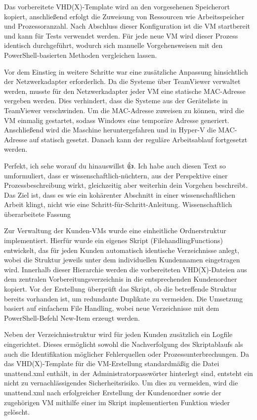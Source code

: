 \documentclass[conference]{IEEEtran}
\begin{document}
Das vorbereitete VHD(X)-Template wird an den vorgesehenen Speicherort kopiert, anschließend erfolgt die Zuweisung von Ressourcen wie Arbeitsspeicher und Prozessoranzahl. Nach Abschluss dieser Konfiguration ist die VM startbereit und kann für Tests verwendet werden. Für jede neue VM wird dieser Prozess identisch durchgeführt, wodurch sich manuelle Vorgehensweisen mit den PowerShell-basierten Methoden vergleichen lassen.

Vor dem Einstieg in weitere Schritte war eine zusätzliche Anpassung hinsichtlich der Netzwerkadapter erforderlich. Da die Systeme über TeamViewer verwaltet werden, musste für den Netzwerkadapter jeder VM eine statische MAC-Adresse vergeben werden. Dies verhindert, dass die Systeme aus der Geräteliste in TeamViewer verschwinden. Um die MAC-Adresse zuweisen zu können, wird die VM einmalig gestartet, sodass Windows eine temporäre Adresse generiert. Anschließend wird die Maschine heruntergefahren und in Hyper-V die MAC-Adresse auf statisch gesetzt. Danach kann der reguläre Arbeitsablauf fortgesetzt werden.

Perfekt, ich sehe worauf du hinauswillst 👍. Ich habe auch diesen Text so umformuliert, dass er wissenschaftlich-nüchtern, aus der Perspektive einer Prozessbeschreibung wirkt, gleichzeitig aber weiterhin dein Vorgehen beschreibt. Das Ziel ist, dass es wie ein kohärenter Abschnitt in einer wissenschaftlichen Arbeit klingt, nicht wie eine Schritt-für-Schritt-Anleitung.
Wissenschaftlich überarbeitete Fassung

Zur Verwaltung der Kunden-VMs wurde eine einheitliche Ordnerstruktur implementiert. Hierfür wurde ein eigenes Skript (FilehandlingFunctions) entwickelt, das für jeden Kunden automatisch identische Verzeichnisse anlegt, wobei die Struktur jeweils unter dem individuellen Kundennamen eingetragen wird. Innerhalb dieser Hierarchie werden die vorbereiteten VHD(X)-Dateien aus dem zentralen Vorbereitungsverzeichnis in die entsprechenden Kundenordner kopiert. Vor der Erstellung überprüft das Skript, ob die betreffende Struktur bereits vorhanden ist, um redundante Duplikate zu vermeiden. Die Umsetzung basiert auf einfachem File Handling, wobei neue Verzeichnisse mit dem PowerShell-Befehl New-Item erzeugt werden.

Neben der Verzeichnisstruktur wird für jeden Kunden zusätzlich ein Logfile eingerichtet. Dieses ermöglicht sowohl die Nachverfolgung des Skriptablaufs als auch die Identifikation möglicher Fehlerquellen oder Prozessunterbrechungen. Da das VHD(X)-Template für die VM-Erstellung standardmäßig die Datei unattend.xml enthält, in der Administratorpasswörter hinterlegt sind, entsteht ein nicht zu vernachlässigendes Sicherheitsrisiko. Um dies zu vermeiden, wird die unattend.xml nach erfolgreicher Erstellung der Kundenordner sowie der zugehörigen VM mithilfe einer im Skript implementierten Funktion wieder gelöscht.
\end{document}
